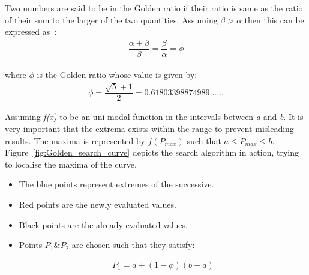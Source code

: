 {Two numbers are said to be in the Golden ratio if their ratio is same as the ratio of their sum to the larger of the two quantities. Assuming $\beta > \alpha$ then this can be expressed as~\cite{Gill81MurrayWright}:\\

\begin{equation}
	\begin{aligned}
		\dfrac{\alpha+\beta}{\beta}=\dfrac{\beta}{\alpha}=\phi
		\label{eq:golden_ratio1}
	\end{aligned}
\end{equation}

where ${\phi}$ is the Golden ratio whose value is given by:\\

\begin{equation}
	\begin{aligned}
		 \phi=\dfrac{\sqrt{5}\mp1}{2}= 0.61803398874989......
		\label{eq:golden_ratio}
	\end{aligned}
\end{equation}
 
 
 Assuming \textit{f(x)} to be an uni-modal function in the intervals between  \textit{a} and \textit{b}. It is very important that the extrema exists within the range to prevent misleading results. The maxima is represented by $\textit{f}(P_{\textit{max}})$ such that $a\leq P_{\textit{max}} \leq b $. Figure~\ref{fig:Golden_search_curve} depicts the search algorithm in action, trying to localise the maxima of the curve. 
  
 \begin{itemize}
  	 \item The blue points represent extremes of the successive.
  	 \item Red points  are the newly evaluated values.
  	 \item Black points are the already evaluated values.
   \end{itemize}
   
 \begin{itemize}
 
 \item Points $P_{1} \& P_{2}$ are chosen such that they satisfy:
 
\begin{equation}
	\begin{aligned}
		 P_{1}=a+(1-\phi)(b-a)
		\label{eq:golden_ratio_p1}
	\end{aligned}
\end{equation}


\end{itemize}}
